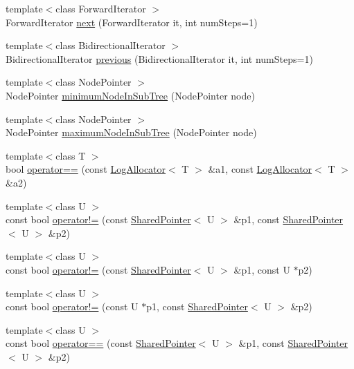 \begin{DoxyCompactItemize}
{\footnotesize template$<$class Forward\+Iterator $>$ }\\Forward\+Iterator \hyperlink{namespaceprism_a16771cef03b7354150e188f4ce10f6b1}{next} (Forward\+Iterator it, int num\+Steps=1)
\item 
{\footnotesize template$<$class Bidirectional\+Iterator $>$ }\\Bidirectional\+Iterator \hyperlink{namespaceprism_a8370841f58d9898247afa42c49a7658d}{previous} (Bidirectional\+Iterator it, int num\+Steps=1)
\item 
{\footnotesize template$<$class Node\+Pointer $>$ }\\Node\+Pointer \hyperlink{namespaceprism_a8aab2862319b55b02ddcb6b9659b3699}{minimum\+Node\+In\+Sub\+Tree} (Node\+Pointer node)
\item 
{\footnotesize template$<$class Node\+Pointer $>$ }\\Node\+Pointer \hyperlink{namespaceprism_a6db5694fde99b39da76f51463f300c4a}{maximum\+Node\+In\+Sub\+Tree} (Node\+Pointer node)
\item 
{\footnotesize template$<$class T $>$ }\\bool \hyperlink{namespaceprism_a7f163cf0ef281768da60b400045aa8d8}{operator==} (const \hyperlink{classprism_1_1_log_allocator}{Log\+Allocator}$<$ T $>$ \&a1, const \hyperlink{classprism_1_1_log_allocator}{Log\+Allocator}$<$ T $>$ \&a2)
\item 
{\footnotesize template$<$class U $>$ }\\const bool \hyperlink{namespaceprism_a9df924e4deb059bf1200701c8235410a}{operator!=} (const \hyperlink{classprism_1_1_shared_pointer}{Shared\+Pointer}$<$ U $>$ \&p1, const \hyperlink{classprism_1_1_shared_pointer}{Shared\+Pointer}$<$ U $>$ \&p2)
\item 
{\footnotesize template$<$class U $>$ }\\const bool \hyperlink{namespaceprism_ad6391c124e006b0e3a3ec67f55e208b0}{operator!=} (const \hyperlink{classprism_1_1_shared_pointer}{Shared\+Pointer}$<$ U $>$ \&p1, const U $\ast$p2)
\item 
{\footnotesize template$<$class U $>$ }\\const bool \hyperlink{namespaceprism_ab8792dbd5cac5678390843bacdb69daa}{operator!=} (const U $\ast$p1, const \hyperlink{classprism_1_1_shared_pointer}{Shared\+Pointer}$<$ U $>$ \&p2)
\item 
{\footnotesize template$<$class U $>$ }\\const bool \hyperlink{namespaceprism_ae53d52e8a36ec7ca58ea1731cc18f1d8}{operator==} (const \hyperlink{classprism_1_1_shared_pointer}{Shared\+Pointer}$<$ U $>$ \&p1, const \hyperlink{classprism_1_1_shared_pointer}{Shared\+Pointer}$<$ U $>$ \&p2)

\end{DoxyCompactItemize}

